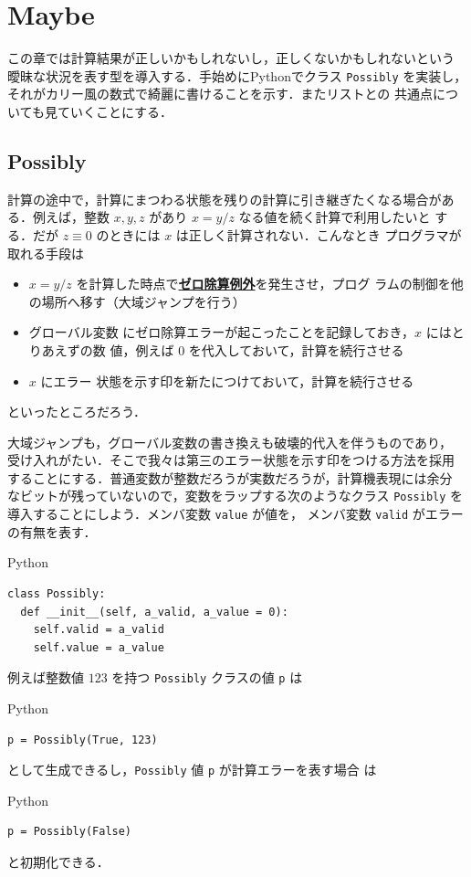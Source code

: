 \documentclass[a5paper,twoside,fleqn,draft]{jsbook}
\newcommand{\programminglanguage}[1]{\textsf{#1}}
\newcommand{\python}{\programminglanguage{Python}}
\newenvironment{leader}{\begingroup\gt}{\endgroup}
\newcommand{\keyword}[1]{{\underline{\textbf{#1}}}}
\newcommand{\code}[1]{\texttt{#1}}
\newenvironment{pythoncode}{\begin{itembox}[r]{\python}}{\end{itembox}}
\begin{document}
\chapter{Maybe}

\begin{leader}
この章では計算結果が正しいかもしれないし，正しくないかもしれないという
曖昧な状況を表す型を導入する．手始めに\python でクラス \code{Possibly}
を実装し，それがカリー風の数式で綺麗に書けることを示す．またリストとの
共通点についても見ていくことにする．
\end{leader}

\section{Possibly}

計算の途中で，計算にまつわる状態を残りの計算に引き継ぎたくなる場合があ
る．例えば，整数 $x,y,z$ があり $x=y/z$ なる値を続く計算で利用したいと
する．だが $z\equiv0$ のときには $x$ は正しく計算されない．こんなとき
プログラマが取れる手段は
\begin{itemize}
\item $x=y/z$ を計算した時点で\keyword{ゼロ除算例外}を発生させ，プログ
  ラムの制御を他の場所へ移す（大域ジャンプを行う）\item グローバル変数
  にゼロ除算エラーが起こったことを記録しておき，$x$ にはとりあえずの数
  値，例えば $0$ を代入しておいて，計算を続行させる\item $x$ にエラー
  状態を示す印を新たにつけておいて，計算を続行させる
\end{itemize}
といったところだろう．

大域ジャンプも，グローバル変数の書き換えも破壊的代入を伴うものであり，
受け入れがたい．そこで我々は第三のエラー状態を示す印をつける方法を採用
することにする．普通変数が整数だろうが実数だろうが，計算機表現には余分
なビットが残っていないので，変数をラップする次のようなクラス
\code{Possibly} を導入することにしよう．メンバ変数 \code{value} が値を，
メンバ変数 \code{valid} がエラーの有無を表す．
\begin{pythoncode}
\begin{verbatim}
class Possibly:
  def __init__(self, a_valid, a_value = 0):
    self.valid = a_valid
    self.value = a_value
\end{verbatim}
\end{pythoncode}

例えば整数値 $123$ を持つ \code{Possibly} クラスの値 \code{p} は
\begin{pythoncode}
\begin{verbatim}
p = Possibly(True, 123)
\end{verbatim}
\end{pythoncode}
として生成できるし，\code{Possibly} 値 \code{p} が計算エラーを表す場合
は
\begin{pythoncode}
\begin{verbatim}
p = Possibly(False)
\end{verbatim}
\end{pythoncode}
と初期化できる．
\end{document}
